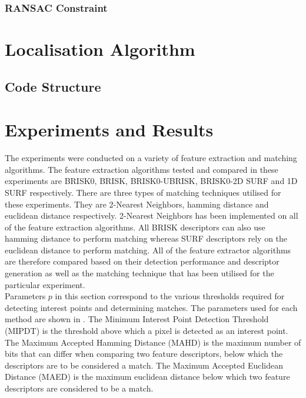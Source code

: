 \documentclass{article}
\begin{document}
\subsubsection{RANSAC Constraint}
\label{sec:ransacConstraint}




\section{Localisation Algorithm}
\label{sec:localisation}

\subsection{Code Structure}
\label{sec:codeStructure}

\section{Experiments and Results}
\label{sec:experimentsResults}
The experiments were conducted on a variety of feature extraction and matching algorithms. The feature extraction algorithms tested and compared in these experiments are BRISK0, BRISK, BRISK0-UBRISK, BRISK0-2D SURF and 1D SURF respectively. There are three types of matching techniques utilised for these experiments. They are 2-Nearest Neighbors, hamming distance and euclidean distance respectively. 2-Nearest Neighbors has been implemented on all of the feature extraction algorithms. All BRISK descriptors can also use hamming distance to perform matching whereas SURF descriptors rely on the euclidean distance to perform matching. All of the feature extractor algorithms are therefore compared based on their detection performance and descriptor generation as well as the matching technique that has been utilised for the particular experiment.\\

Parameters $p$ in this section correspond to the various thresholds required for detecting interest points and determining matches. The parameters used for each method are shown in . The Minimum Interest Point Detection Threshold (MIPDT) is the threshold above which a pixel is detected as an interest point. The Maximum Accepted Hamming Distance (MAHD) is the maximum number of bits that can differ when comparing two feature descriptors, below which the descriptors are to be considered a match. The Maximum Accepted Euclidean Distance (MAED) is the maximum euclidean distance below which two feature descriptors are considered to be a match.\\
\end{document}

